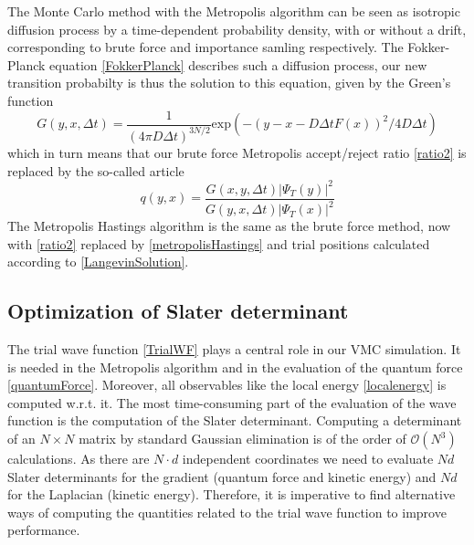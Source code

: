 \documentclass[english, a4paper]{article}
\begin{document}
\noindent The Monte Carlo method with the Metropolis algorithm can be seen as isotropic diffusion process 
by a time-dependent 
probability density, with or without a drift, corresponding to brute force and importance samling respectively.
The Fokker-Planck equation \eqref{FokkerPlanck} describes such a diffusion process, our
new transition probabilty is thus the solution to this equation, given by the Green's function
\begin{equation}
 G(y, x, \Delta t) = \frac{1}{(4\pi D \Delta t)^{3N/2}}
 \textrm{exp}(-(y - x - D\Delta t F(x))^2 / 4D\Delta t)
\end{equation}
which in turn means that our brute force Metropolis accept/reject ratio \eqref{ratio2} is replaced by
the so-called  article
\begin{equation}
 q(y, x) = \frac{G(x, y, \Delta t)|\Psi_T(y)|^2}{G(y, x, \Delta t)|\Psi_T(x)|^2}
 \label{metropolisHastings}
\end{equation}
The Metropolis Hastings algorithm is the same as the brute force method, now with \eqref{ratio2} replaced by 
\eqref{metropolisHastings} and trial positions
calculated according to \eqref{LangevinSolution}.

\subsection{Optimization of Slater determinant}

The trial wave function \eqref{TrialWF} plays a central role in our VMC simulation.
It is needed in the Metropolis algorithm and in the evaluation of the quantum force \eqref{quantumForce}.
Moreover, all observables like the local energy \eqref{localenergy} is computed w.r.t. it. 
The most time-consuming part of the evaluation of the wave function is the computation of the Slater determinant. 
Computing a determinant of an $ N \times N$ matrix by standard Gaussian elimination is of the order of
$\mathcal{O}(N^3)$ calculations. As there are $N \cdot d$ independent coordinates we need to 
evaluate $Nd$ Slater determinants for the gradient (quantum force and kinetic energy) and $Nd$ for 
the Laplacian (kinetic energy). Therefore, it is imperative to find alternative ways of computing
the quantities related to the trial wave function to improve performance. \\
\end{document}
